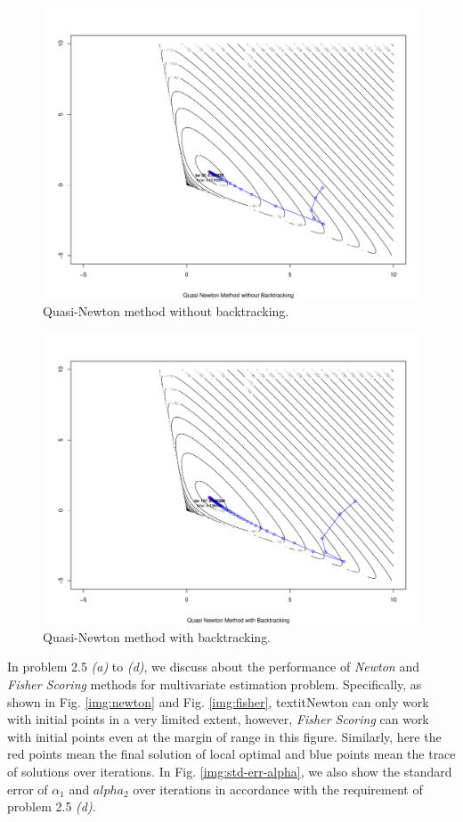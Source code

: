 \begin{figure}[h!]
\includegraphics[scale=0.3]{figs/quasi-noback.pdf}
\caption{Quasi-Newton method without backtracking.}
\label{img:quasi-noback}
\end{figure}

\begin{figure}[h!]
\includegraphics[scale=0.3]{figs/quasi-back.pdf}
\caption{Quasi-Newton method with backtracking.}
\label{img:quasi-back}
\end{figure}

In problem 2.5 \textit{(a)} to \textit{(d)}, we discuss about the performance of \textit{Newton} and \textit{Fisher Scoring} methods for multivariate estimation problem. Specifically, as shown in Fig. \ref{img:newton} and Fig. \ref{img:fisher}, textit{Newton} can only work with initial points in a very limited extent, however, \textit{Fisher Scoring} can work with initial points even at the margin of range in this figure. Similarly, here the red points mean the final solution of local optimal and blue points mean the trace of solutions over iterations. In Fig. \ref{img:std-err-alpha}, we also show the standard error of $\alpha_1$ and $alpha_2$ over iterations in accordance with the requirement of problem 2.5 \textit{(d)}.

